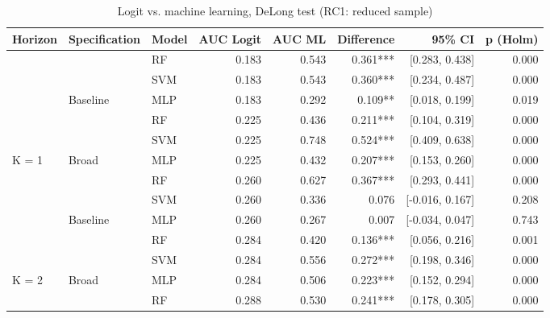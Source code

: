 \begin{table}

\caption{\label{tab:delong_rc1}Logit vs. machine learning, DeLong test (RC1: reduced sample)}
\centering
\begin{threeparttable}
\begin{tabular}[t]{lllrrrrr}
\toprule
Horizon & Specification & Model & AUC Logit & AUC ML & Difference & 95\% CI & p (Holm)\\
\midrule
 &  & RF & 0.183 & 0.543 & 0.361*** & {}[0.283, 0.438] & 0.000\\

 &  & SVM & 0.183 & 0.543 & 0.360*** & {}[0.234, 0.487] & 0.000\\

 & \multirow[t]{-2}{*}[\normalbaselineskip]{\raggedright\arraybackslash Baseline} & MLP & 0.183 & 0.292 & 0.109** & {}[0.018, 0.199] & 0.019\\

 &  & RF & 0.225 & 0.436 & 0.211*** & {}[0.104, 0.319] & 0.000\\

 &  & SVM & 0.225 & 0.748 & 0.524*** & {}[0.409, 0.638] & 0.000\\

\multirow[t]{-5}{*}[\normalbaselineskip]{\raggedright\arraybackslash K = 1} & \multirow[t]{-2}{*}[\normalbaselineskip]{\raggedright\arraybackslash Broad} & MLP & 0.225 & 0.432 & 0.207*** & {}[0.153, 0.260] & 0.000\\
\cmidrule{1-8}
 &  & RF & 0.260 & 0.627 & 0.367*** & {}[0.293, 0.441] & 0.000\\

 &  & SVM & 0.260 & 0.336 & 0.076 & {}[-0.016, 0.167] & 0.208\\

 & \multirow[t]{-2}{*}[\normalbaselineskip]{\raggedright\arraybackslash Baseline} & MLP & 0.260 & 0.267 & 0.007 & {}[-0.034, 0.047] & 0.743\\

 &  & RF & 0.284 & 0.420 & 0.136*** & {}[0.056, 0.216] & 0.001\\

 &  & SVM & 0.284 & 0.556 & 0.272*** & {}[0.198, 0.346] & 0.000\\

\multirow[t]{-5}{*}[\normalbaselineskip]{\raggedright\arraybackslash K = 2} & \multirow[t]{-2}{*}[\normalbaselineskip]{\raggedright\arraybackslash Broad} & MLP & 0.284 & 0.506 & 0.223*** & {}[0.152, 0.294] & 0.000\\
\cmidrule{1-8}
 &  & RF & 0.288 & 0.530 & 0.241*** & {}[0.178, 0.305] & 0.000\\


\end{tabular}
\end{threeparttable}
\end{table}
